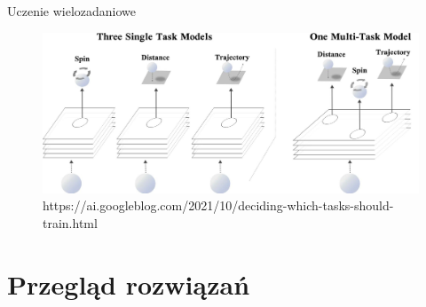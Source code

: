 \documentclass[10pt]{beamer}
\begin{document}
    \begin{frame}{Uczenie wielozadaniowe}
        \begin{figure}
            \includegraphics[width=\textwidth]{images/multitask.jpg}
            \caption{https://ai.googleblog.com/2021/10/deciding-which-tasks-should-train.html}
        \end{figure}
        
    \end{frame}
    \section[Przegląd rozwiązań]{Przegląd rozwiązań}
    
        
            
\end{document}
